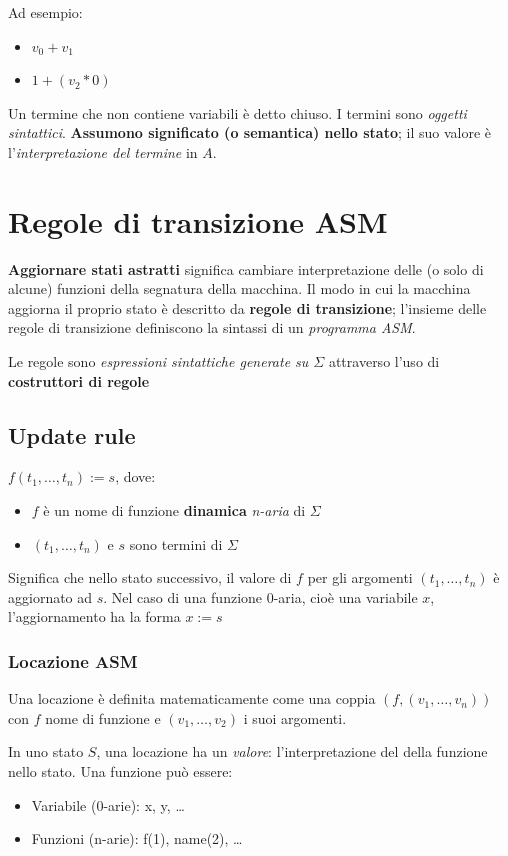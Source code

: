 \noindent Ad esempio:
\begin{itemize}
    \item $v_0 + v_1$
    \item $1 + (v_2 * 0)$
\end{itemize}

\noindent Un termine che non contiene variabili è detto chiuso. I termini 
sono \textit{oggetti sintattici}. \textbf{Assumono significato (o semantica)
nello stato}; il suo valore è l'\textit{interpretazione del termine} in $A$.

\newpage
\section{Regole di transizione ASM}
\textbf{Aggiornare stati astratti} significa cambiare interpretazione delle 
(o solo di alcune) funzioni della segnatura della macchina. Il modo in cui la macchina 
aggiorna il proprio stato è descritto da \textbf{regole di transizione}; l'insieme 
delle regole di transizione definiscono la sintassi di un \textit{programma ASM}.

\noindent Le regole sono \textit{espressioni sintattiche generate su $\Sigma$} attraverso 
l'uso di \textbf{costruttori di regole} 

\subsection{Update rule}

$f(t_1, \dots, t_n) := s$, dove:
\begin{itemize}
    \item $f$ è un nome di funzione \textbf{dinamica} \textit{n-aria} di $\Sigma$
    \item $(t_1, \dots, t_n)$ e $s$ sono termini di $\Sigma$
\end{itemize}

\noindent Significa che nello stato successivo, il valore di $f$ per gli 
argomenti $(t_1, \dots, t_n)$ è aggiornato ad $s$. Nel caso di una funzione 0-aria, 
cioè una variabile $x$, l'aggiornamento ha la forma $x := s$


\subsubsection{Locazione ASM}
Una locazione è definita matematicamente come una coppia $(f, (v_1, \dots, v_n))$ con 
$f$ nome di funzione e $(v_1, \dots, v_2)$ i suoi argomenti.

\noindent In uno stato $S$, una locazione ha un \textit{valore}: l'interpretazione del 
della funzione nello stato. Una funzione può essere: 
\begin{itemize}
    \item Variabile (0-arie): x, y, \dots
    \item Funzioni (n-arie): f(1), name(2), \dots
\end{itemize}


